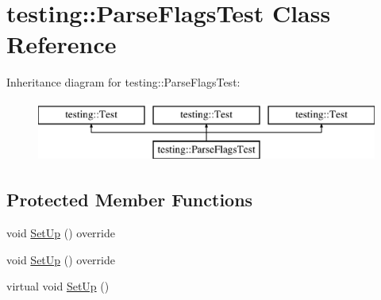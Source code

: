 \hypertarget{classtesting_1_1_parse_flags_test}{}\section{testing\+::Parse\+Flags\+Test Class Reference}
\label{classtesting_1_1_parse_flags_test}
Inheritance diagram for testing\+::Parse\+Flags\+Test\+:\begin{figure}[H]
\begin{center}
\leavevmode
\includegraphics[height=2.000000cm]{d1/d53/classtesting_1_1_parse_flags_test}
\end{center}
\end{figure}
\subsection*{Protected Member Functions}
\begin{DoxyCompactItemize}
\item 
void \mbox{\hyperlink{classtesting_1_1_parse_flags_test_a91b31cd2a108511459f49e31dcbeabe8}{Set\+Up}} () override
\item 
void \mbox{\hyperlink{classtesting_1_1_parse_flags_test_a91b31cd2a108511459f49e31dcbeabe8}{Set\+Up}} () override
\item 
virtual void \mbox{\hyperlink{classtesting_1_1_parse_flags_test_a72fd683f0bc0c2701d9a183c6b20cb48}{Set\+Up}} ()
\end{DoxyCompactItemize}

